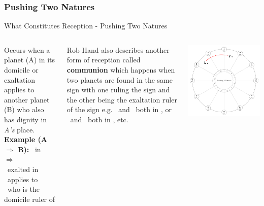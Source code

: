 \subsubsection{Pushing Two Natures}
\begin{frame}[t]{What Constitutes Reception - Pushing Two Natures}
\begin{columns}[T, onlytextwidth]
Occurs when a planet (A) in its domicile or exaltation applies to another planet (B) who also has dignity in \textsl{A's} place\footnotemark[1].\\
\vspace{0.25cm}
\textbf{Example (A $\Rightarrow$ B):} \Venus\ in \Pisces\ $\Rightarrow$ \Jupiter \\
\ul
\Venus\ exalted in \Pisces\ applies to \\
\Jupiter\ who is the domicile ruler of \Pisces \\
\vspace{0.25cm}

Rob Hand also describes another form of reception called \textbf{communion} which happens when two planets are found in the same sign with one ruling the sign and the other being the exaltation ruler of the sign e.g. \Moon\ and \Jupiter\ both in \Cancer, or \Mars\ and \Sun\ both in \Aries, etc.

\vspace{-0.5cm}
\begin{center}
{\includegraphics[width=\textwidth]{charts/01-pushing-two-natures}} \\
\end{center}

\end{columns}
\end{frame}

